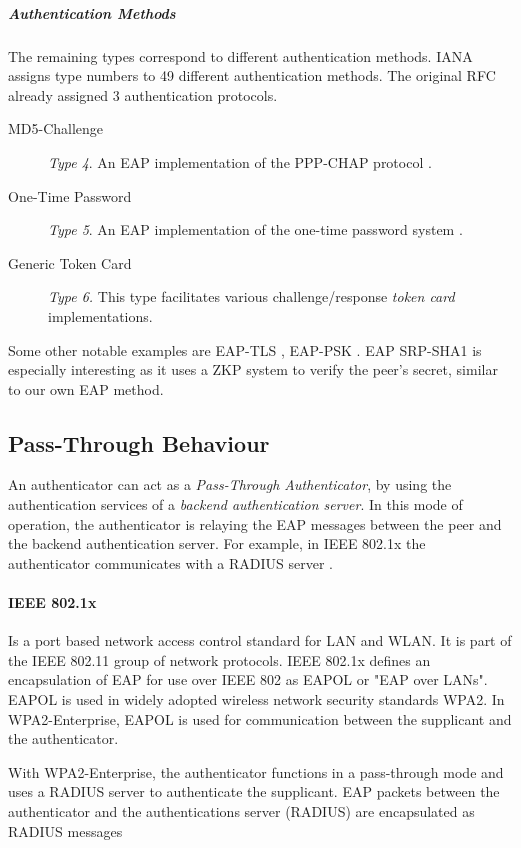 \subparagraph{Authentication Methods}
The remaining types correspond to different authentication methods.
IANA \cite{joseph2004eap} assigns type numbers to 49 different authentication methods.
The original RFC \cite{aboba2004extensible} already assigned 3 authentication protocols.

\begin{description}
	\item[MD5-Challenge] \textit{Type 4}. An EAP implementation of the PPP-CHAP protocol \cite{simon2008eap}.
	\item[One-Time Password] \textit{Type 5}. An EAP implementation of the one-time password system \cite{haller1998one}.
	\item[Generic Token Card] \textit{Type 6.} This type facilitates various challenge/response \textit{token card} implementations.
\end{description}

Some other notable examples are EAP-TLS \cite{simon2008eap}, EAP-PSK \cite{bersani2007eap}.
EAP SRP-SHA1 \cite{ietf-pppext-eap-srp-03} is especially interesting as it uses a ZKP system to verify the peer's secret, similar to our own EAP method.

\subsection{Pass-Through Behaviour}
An authenticator can act as a \textit{Pass-Through Authenticator}, by using the authentication services of a \textit{backend authentication server}.
In this mode of operation, the authenticator is relaying the EAP messages between the peer and the backend authentication server.
For example, in IEEE 802.1x the authenticator communicates with a RADIUS server \cite{congdon2003ieee}.

\paragraph{IEEE 802.1x}

Is a port based network access control standard for LAN and WLAN.
It is part of the IEEE 802.11 group of network protocols.
IEEE 802.1x defines an encapsulation of EAP for use over IEEE 802 as EAPOL or "EAP over LANs".
EAPOL is used in widely adopted wireless network security standards WPA2. 
In WPA2-Enterprise, EAPOL is used for communication between the supplicant and the authenticator.

With WPA2-Enterprise, the authenticator functions in a pass-through mode and uses a RADIUS server to authenticate the supplicant.
EAP packets between the authenticator and the authentications server (RADIUS) are encapsulated as RADIUS messages \cite{aboba2003radius, chen2005extensible, congdon2003ieee}

